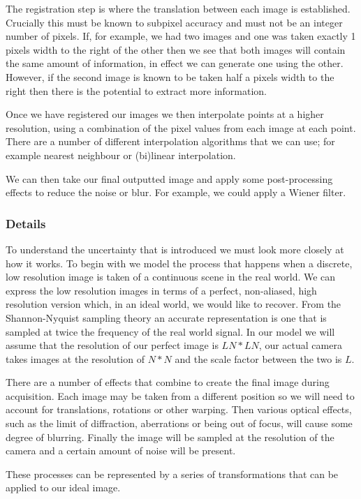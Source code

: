 \documentclass[
  oneside,
  11pt, a4paper,
  footinclude=true,
  headinclude=true,
  cleardoublepage=empty
]{scrbook}
\begin{document}
The registration step is where the translation between each image is established. Crucially this must be known to subpixel accuracy and must not be an integer number of pixels. If, for example, we had two images and one was taken exactly 1 pixels width to the right of the other then we see that both images will contain the same amount of information, in effect we can generate one using the other. However, if the second image is known to be taken half a pixels width to the right then there is the potential to extract more information.

Once we have registered our images we then interpolate points at a higher resolution, using a combination of the pixel values from each image at each point. There are a number of different interpolation algorithms that we can use; for example nearest neighbour or (bi)linear interpolation.

We can then take our final outputted image and apply some post-processing effects to reduce the noise or blur. For example, we could apply a Wiener filter\cite{wienerfilter}.

\subsubsection*{Details}
To understand the uncertainty that is introduced we must look more closely at how it works.
To begin with we model the process that happens when a discrete, low resolution image is taken of a continuous scene in the real world. We can express the low resolution images in terms of a perfect, non-aliased, high resolution version which, in an ideal world, we would like to recover. From the Shannon-Nyquist sampling theory an accurate representation is one that is sampled at twice the frequency of the real world signal\cite{shannonnyquist}. In our model we will assume that the resolution of our perfect image is $LN * LN$, our actual camera takes images at the resolution of $N * N$ and the scale factor between the two is $L$.

There are a number of effects that combine to create the final image during acquisition. Each image may be taken from a different position so we will need to account for translations, rotations or other warping. Then various optical effects, such as the limit of diffraction, aberrations or being out of focus, will cause some degree of blurring. Finally the image will be sampled at the resolution of the camera and a certain amount of noise will be present.

These processes can be represented by a series of transformations that can be applied to our ideal image.
\end{document}

